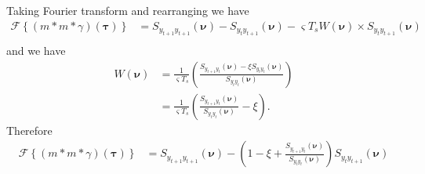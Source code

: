 \documentclass[]{article}
\begin{document}
Taking Fourier transform and rearranging we have
\begin{align}
 \mathcal F\left\lbrace (m\ast m \ast \gamma)(\boldsymbol\tau)\right\rbrace&= S_{y_{t+1}y_{t+1}}(\boldsymbol{\nu})-S_{y_{t}y_{t+1}}(\boldsymbol{\nu})-\varsigma T_s W(\boldsymbol{\nu}) \times S_{y_ty_{t+1}}(\boldsymbol{\nu}) \nonumber \\
\end{align}
and we have
\begin{align}
 W(\boldsymbol{\nu}) &=\frac{1}{\varsigma T_s}\left(\frac{S_{y_{t+1}y_t}(\boldsymbol{\nu}) -\xi S_{y_ty_t}(\boldsymbol{\nu})}{S_{y_ty_t}(\boldsymbol{\nu})}\right) \nonumber \\
&=\frac{1}{\varsigma T_s}\left(\frac{S_{y_{t+1}y_t}(\boldsymbol{\nu})}{S_{y_ty_t}(\boldsymbol{\nu})}-\xi\right).
\end{align}
Therefore
\begin{align}
 \mathcal F\left\lbrace (m\ast m \ast \gamma)(\boldsymbol\tau)\right\rbrace&= S_{y_{t+1}y_{t+1}}(\boldsymbol{\nu})-\left(1-\xi+\frac{S_{y_{t+1}y_t}(\boldsymbol{\nu})}{S_{y_ty_t}(\boldsymbol{\nu})}\right)S_{y_{t}y_{t+1}}(\boldsymbol{\nu})
\end{align}
\newpage
\end{document}
